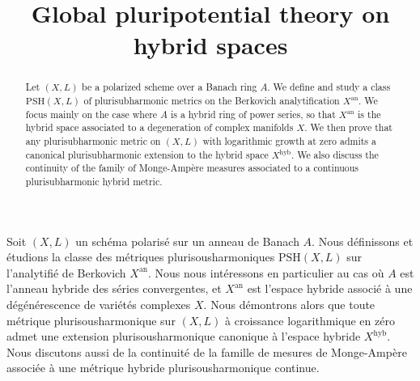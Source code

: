 \documentclass[JEP,XML,SOM,Unicode,published]{cedram}
\theoremstyle{definition}
\begin{document}
\frontmatter
\title[Global pluripotential theory on hybrid spaces]{Global pluripotential theory on\\ hybrid spaces}

\author[\initial{L.} \lastname{Pille-Schneider}]{ }
\address{Département de Mathématiques et Applications,
École Normale Supérieure\\
45 rue d'Ulm, 75005 Paris, France}

\begin{abstract}
Let $(X,L)$ be a polarized scheme over a Banach ring $A$. We define and study a class $\mathrm{PSH}(X,L)$ of plurisubharmonic metrics on the Berkovich analytification $X^\mathrm{an}$. We focus mainly on the case where $A$ is a hybrid ring of power series, so that $X^\mathrm{an}$ is the hybrid space associated to a degeneration of complex manifolds $X$.
We then prove that any plurisubharmonic metric on $(X,L)$ with logarithmic growth at zero admits a canonical plurisubharmonic extension to the hybrid space $X^\mathrm{hyb}$. We also discuss the continuity of the family of Monge-Ampère measures associated to a continuous plurisubharmonic hybrid metric.
\end{abstract}





\begin{altabstract}
Soit $(X,L)$ un schéma polarisé sur un anneau de Banach $A$. Nous définissons et étudions la classe des métriques plurisousharmoniques $\mathrm{PSH}(X, L)$ sur l’analytifié de Berkovich $X^\mathrm{an}$. Nous nous intéressons en particulier au cas où $A$ est l’anneau hybride des séries convergentes, et $X^\mathrm{an}$ est l’espace hybride associé à une dégénérescence de variétés complexes $X$.
Nous démontrons alors que toute métrique plurisousharmonique sur $(X, L)$ à croissance logarithmique en zéro admet une extension plurisousharmonique canonique à l’espace hybride $X^\mathrm{hyb}$. Nous discutons aussi de la continuité de la famille de mesures de Monge-Ampère associée à une métrique hybride plurisousharmonique continue.
\end{altabstract}
\maketitle
\vspace*{-\baselineskip}
\tableofcontents
\mainmatter
\end{document}
